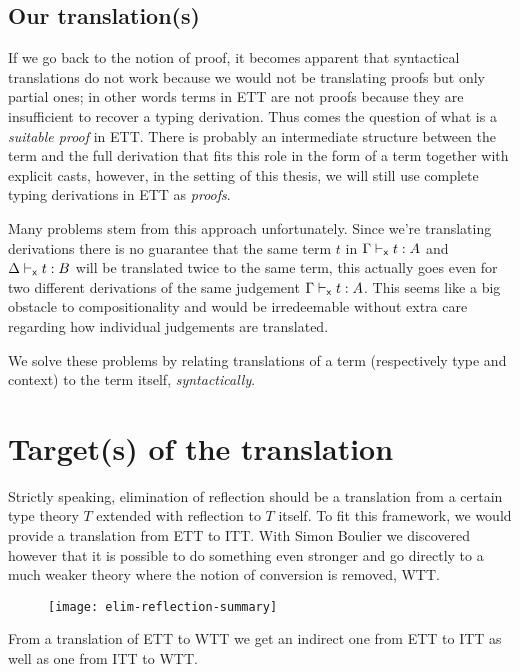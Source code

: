 \subsection{Our translation(s)}

If we go back to the notion of proof, it becomes apparent that
syntactical translations do not work because we would not be translating proofs
but only partial ones; in other words terms in \acrshort{ETT} are not proofs
because they are insufficient to recover a typing derivation.
Thus comes the question of what is a \emph{suitable proof} in \acrshort{ETT}.
There is probably an intermediate structure between the term and the full
derivation that fits this role in the form of a term together with explicit
casts, however, in the setting of this thesis, we will still use complete
typing derivations in \acrshort{ETT} as \emph{proofs}.

Many problems stem from this approach unfortunately. Since we're translating
derivations there is no guarantee that the same term \(t\) in
\(\Gamma \vdash_{\mathsf{x}} t : A\) and \(\Delta \vdash_{\mathsf{x}} t : B\) will be translated
twice to the same term, this actually goes even for two different derivations
of the same judgement \(\Gamma \vdash_{\mathsf{x}} t : A\).
This seems like a big obstacle to compositionality and would be irredeemable
without extra care regarding how individual judgements are translated.

We solve these problems by relating translations of a term (respectively
type and context) to the term itself, \emph{syntactically}.

\section{Target(s) of the translation}

Strictly speaking, elimination of reflection should be a translation from a
certain type theory \(T\) extended with reflection to \(T\) itself.
To fit this framework, we would provide a translation from \acrshort{ETT}
to \acrshort{ITT}. With Simon Boulier we discovered however that it is possible
to do something even stronger and go directly to a much weaker theory where
the notion of conversion is removed, \acrshort{WTT}.

\begin{figure}[hb]
  \texttt{[image: elim-reflection-summary]}
\end{figure}

From a translation of \acrshort{ETT} to \acrshort{WTT} we get an indirect one
from \acrshort{ETT} to \acrshort{ITT} as well as one from \acrshort{ITT} to
\acrshort{WTT}.

